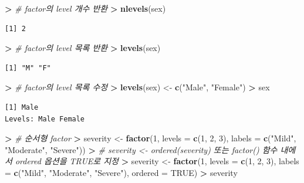 \documentclass[11pt,a4paper]{book}
\newenvironment{Shaded}{\begin{snugshade}}{\end{snugshade}}
\newcommand{\KeywordTok}[1]{\textcolor[rgb]{0.13,0.29,0.53}{\textbf{#1}}}
\newcommand{\DataTypeTok}[1]{\textcolor[rgb]{0.13,0.29,0.53}{#1}}
\newcommand{\DecValTok}[1]{\textcolor[rgb]{0.00,0.00,0.81}{#1}}
\newcommand{\StringTok}[1]{\textcolor[rgb]{0.31,0.60,0.02}{#1}}
\newcommand{\CommentTok}[1]{\textcolor[rgb]{0.56,0.35,0.01}{\textit{#1}}}
\newcommand{\OtherTok}[1]{\textcolor[rgb]{0.56,0.35,0.01}{#1}}
\newcommand{\OperatorTok}[1]{\textcolor[rgb]{0.81,0.36,0.00}{\textbf{#1}}}
\newcommand{\ErrorTok}[1]{\textcolor[rgb]{0.64,0.00,0.00}{\textbf{#1}}}
\newcommand{\NormalTok}[1]{#1}
\theoremstyle{definition}
\theoremstyle{definition}
\theoremstyle{definition}
\theoremstyle{remark}
\begin{document}
\begin{Shaded}
\begin{Highlighting}[]
\OperatorTok{>}\StringTok{ }\CommentTok{# factor의 level 개수 반환}
\ErrorTok{>}\StringTok{ }\KeywordTok{nlevels}\NormalTok{(sex)}
\end{Highlighting}
\end{Shaded}

\begin{verbatim}
[1] 2
\end{verbatim}

\begin{Shaded}
\begin{Highlighting}[]
\OperatorTok{>}\StringTok{ }\CommentTok{# factor의 level 목록 반환}
\ErrorTok{>}\StringTok{ }\KeywordTok{levels}\NormalTok{(sex)}
\end{Highlighting}
\end{Shaded}

\begin{verbatim}
[1] "M" "F"
\end{verbatim}

\begin{Shaded}
\begin{Highlighting}[]
\OperatorTok{>}\StringTok{ }\CommentTok{# factor의 level 목록 수정}
\ErrorTok{>}\StringTok{ }\KeywordTok{levels}\NormalTok{(sex) <-}\StringTok{ }\KeywordTok{c}\NormalTok{(}\StringTok{"Male"}\NormalTok{, }\StringTok{"Female"}\NormalTok{)}
\OperatorTok{>}\StringTok{ }\NormalTok{sex}
\end{Highlighting}
\end{Shaded}

\begin{verbatim}
[1] Male
Levels: Male Female
\end{verbatim}

\begin{Shaded}
\begin{Highlighting}[]
\OperatorTok{>}\StringTok{ }\CommentTok{# 순서형 factor}
\ErrorTok{>}\StringTok{ }\NormalTok{severity <-}\StringTok{ }\KeywordTok{factor}\NormalTok{(}\DecValTok{1}\NormalTok{, }\DataTypeTok{levels =} \KeywordTok{c}\NormalTok{(}\DecValTok{1}\NormalTok{, }\DecValTok{2}\NormalTok{, }\DecValTok{3}\NormalTok{), }\DataTypeTok{labels =} \KeywordTok{c}\NormalTok{(}\StringTok{"Mild"}\NormalTok{, }\StringTok{"Moderate"}\NormalTok{, }\StringTok{"Severe"}\NormalTok{))}
\OperatorTok{>}\StringTok{ }\CommentTok{# severity <- ordered(severity) 또는 factor() 함수 내에서 ordered 옵션을 TRUE로 지정}
\ErrorTok{>}\StringTok{ }\NormalTok{severity <-}\StringTok{ }\KeywordTok{factor}\NormalTok{(}\DecValTok{1}\NormalTok{, }\DataTypeTok{levels =} \KeywordTok{c}\NormalTok{(}\DecValTok{1}\NormalTok{, }\DecValTok{2}\NormalTok{, }\DecValTok{3}\NormalTok{), }\DataTypeTok{labels =} \KeywordTok{c}\NormalTok{(}\StringTok{"Mild"}\NormalTok{, }\StringTok{"Moderate"}\NormalTok{, }\StringTok{"Severe"}\NormalTok{), }\DataTypeTok{ordered =} \OtherTok{TRUE}\NormalTok{)}
\OperatorTok{>}\StringTok{ }\NormalTok{severity}
\end{Highlighting}
\end{Shaded}
\end{document}

